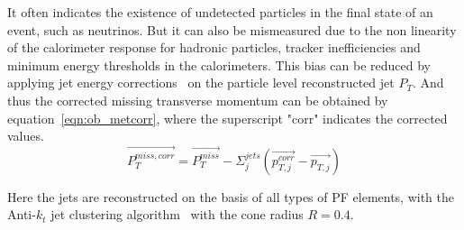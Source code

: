 It often indicates the existence of undetected particles in the final state of an event, such as neutrinos. But it can also be mismeasured due to the non linearity of the calorimeter response for hadronic particles, tracker inefficiencies and minimum energy thresholds in the calorimeters. This bias can be reduced by applying jet energy corrections~\cite{ob_jetcorr} on the particle level reconstructed jet $P_T$. And thus the corrected missing transverse momentum can be obtained by equation~\ref{eqn:ob_metcorr}, where the superscript "corr" indicates the corrected values.
\begin{equation}
\vec{P_T ^{miss,corr}} = \vec{P_T ^{miss}} - \Sigma_{j}^{jets} (\vec{p_{T,j} ^{corr}} - \vec{p_{T,j}} )
\label{eqn:ob_metcorr}
\end{equation}

Here the jets are reconstructed on the basis of all types of PF elements, with the Anti-$k_t$ jet clustering algorithm~\cite{ob_jetantikt} with the cone radius $R=0.4$.

